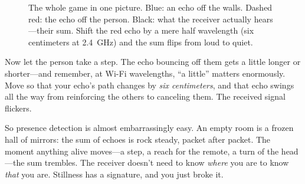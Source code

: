 \documentclass[11pt, letterpaper]{article}
\begin{document}
\begin{figure}[ht]
\centering
{}
\caption{The whole game in one picture. Blue: an echo off the walls. Dashed red: the echo off the person. Black: what the receiver actually hears---their sum. Shift the red echo by a mere half wavelength (six centimeters at 2.4~GHz) and the sum flips from loud to quiet.}
\label{fig:superposition}
\end{figure}

Now let the person take a step. The echo bouncing off them gets a little longer or shorter---and remember, at Wi-Fi wavelengths, ``a little'' matters enormously. Move so that your echo's path changes by \textit{six centimeters}, and that echo swings all the way from reinforcing the others to canceling them. The received signal flickers.

So presence detection is almost embarrassingly easy. An empty room is a frozen hall of mirrors: the sum of echoes is rock steady, packet after packet. The moment anything alive moves---a step, a reach for the remote, a turn of the head---the sum trembles. The receiver doesn't need to know \textit{where} you are to know \textit{that} you are. Stillness has a signature, and you just broke it.
\end{document}
